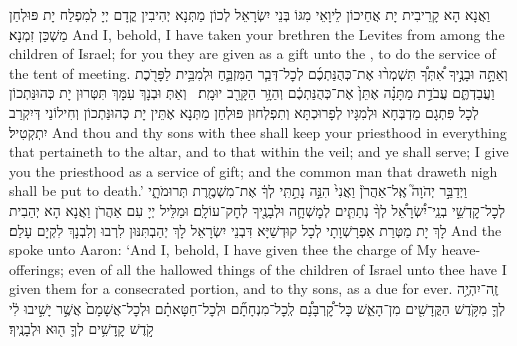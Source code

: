{וַאֲנָא הָא קָרֵיבִית יָת אֲחֵיכוֹן לֵיוָאֵי מִגּוֹ בְּנֵי יִשְׂרָאֵל לְכוֹן מַתְּנָא יְהִיבִין קֳדָם יְיָ לְמִפְלַח יָת פּוּלְחַן מַשְׁכַּן זִמְנָא׃}
{And I, behold, I have taken your brethren the Levites from among the children of Israel; for you they are given as a gift unto the \lord, to do the service of the tent of meeting.}{}
{וְאַתָּ֣ה וּבָנֶ֣יךָ אִ֠תְּךָ֠ תִּשְׁמְר֨וּ אֶת־כְּהֻנַּתְכֶ֜ם לְכׇל־דְּבַ֧ר הַמִּזְבֵּ֛חַ וּלְמִבֵּ֥ית לַפָּרֹ֖כֶת וַעֲבַדְתֶּ֑ם עֲבֹדַ֣ת מַתָּנָ֗ה אֶתֵּן֙ אֶת־כְּהֻנַּתְכֶ֔ם וְהַזָּ֥ר הַקָּרֵ֖ב יוּמָֽת׃ \petucha 
{}}
{וְאַתְּ וּבְנָךְ עִמָּךְ תִּטְּרוּן יָת כְּהוּנַּתְכוֹן לְכָל פִּתְגָם מַדְבְּחָא וּלְמִגָּיו לְפָרוּכְתָּא וְתִפְלְחוּן פּוּלְחַן מַתְּנָא אֶתֵּין יָת כְּהוּנַּתְכוֹן וְחִילוֹנַי דְּיִקְרַב יִתְקְטִיל׃}
{And thou and thy sons with thee shall keep your priesthood in everything that pertaineth to the altar, and to that within the veil; and ye shall serve; I give you the priesthood as a service of gift; and the common man that draweth nigh shall be put to death.’}{}
{וַיְדַבֵּ֣ר יְהֹוָה֮ אֶֽל־אַהֲרֹן֒ וַאֲנִי֙ הִנֵּ֣ה נָתַ֣תִּֽי לְךָ֔ אֶת־מִשְׁמֶ֖רֶת תְּרוּמֹתָ֑י לְכׇל־קׇדְשֵׁ֣י בְנֵֽי־יִ֠שְׂרָאֵ֠ל לְךָ֨ נְתַתִּ֧ים לְמׇשְׁחָ֛ה וּלְבָנֶ֖יךָ לְחׇק־עוֹלָֽם׃
}
{וּמַלֵּיל יְיָ עִם אַהֲרֹן וַאֲנָא הָא יְהַבִית לָךְ יָת מַטְּרַת אַפְרָשְׁוָתָי לְכָל קוּדְשַׁיָּא דִּבְנֵי יִשְׂרָאֵל לָךְ יְהַבְתִּנּוּן לִרְבוּ וְלִבְנָךְ לִקְיָם עָלַם׃}
{And the \lord\space spoke unto Aaron: ‘And I, behold, I have given thee the charge of My heave-offerings; even of all the hallowed things of the children of Israel unto thee have I given them for a consecrated portion, and to thy sons, as a due for ever.}{}
{זֶֽה־יִהְיֶ֥ה לְךָ֛ מִקֹּ֥דֶשׁ הַקֳּדָשִׁ֖ים מִן־הָאֵ֑שׁ כׇּל־קׇ֠רְבָּנָ֠ם לְֽכׇל־מִנְחָתָ֞ם וּלְכׇל־חַטָּאתָ֗ם וּלְכׇל־אֲשָׁמָם֙ אֲשֶׁ֣ר יָשִׁ֣יבוּ לִ֔י קֹ֣דֶשׁ קׇֽדָשִׁ֥ים לְךָ֛ ה֖וּא וּלְבָנֶֽיךָ׃
}
